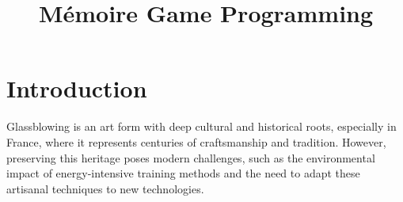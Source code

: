 \documentclass{rapportcs}
\title{Mémoire Game Programming}
\begin{document}




    




    \fairemarges %
    \fairepagedegarde %
    
    \begin{center}
        \begin{abstract}
        \end{abstract}
    \end{center}
    \newpage

    \begingroup %
    \color{blue}
    \tabledematieres %
    \endgroup




    \section{Introduction}

    Glassblowing is an art form with deep cultural and historical roots, especially in France, where it represents centuries of craftsmanship and tradition. However, preserving this heritage poses modern challenges, such as the environmental impact of energy-intensive training methods and the need to adapt these artisanal techniques to new technologies.
\end{document}
